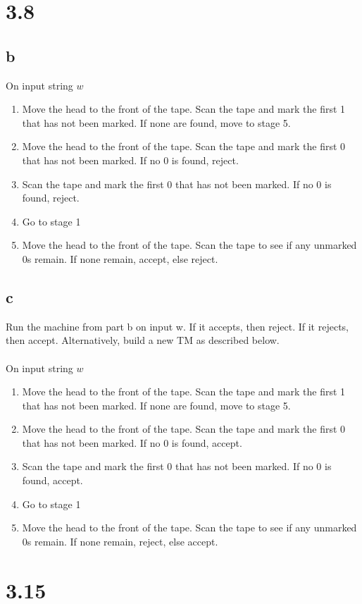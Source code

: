 \documentclass{article}
\begin{document}
\section*{3.8}
\subsection*{b}
On input string $w$
\begin{enumerate}
    \item Move the head to the front of the tape. Scan the tape and mark the first 1 that has not been marked. If none are found, move to stage 5.
    \item Move the head to the front of the tape. Scan the tape and mark the first 0 that has not been marked. If no 0 is found, reject. 
    \item Scan the tape and mark the first 0 that has not been marked. If no 0 is found, reject.
    \item Go to stage 1
    \item Move the head to the front of the tape. Scan the tape to see if any unmarked 0s remain. If none remain, accept, else reject. 
\end{enumerate}

\subsection*{c}
Run the machine from part b on input w. If it accepts, then reject. If it rejects, then accept. Alternatively, build a new TM as described below.\\\\
On input string $w$
\begin{enumerate}
    \item Move the head to the front of the tape. Scan the tape and mark the first 1 that has not been marked. If none are found, move to stage 5.
    \item Move the head to the front of the tape. Scan the tape and mark the first 0 that has not been marked. If no 0 is found, accept. 
    \item Scan the tape and mark the first 0 that has not been marked. If no 0 is found, accept.
    \item Go to stage 1
    \item Move the head to the front of the tape. Scan the tape to see if any unmarked 0s remain. If none remain, reject, else accept. 
\end{enumerate}

\section*{3.15}
\end{document}
